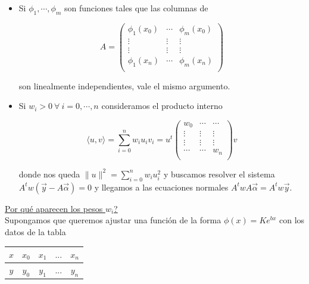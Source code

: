 \begin{itemize}
	\item Si $\phi_{1}, \cdots, \phi_{m}$ son funciones tales que las columnas de
	
	$$
	A = 
	\begin{pmatrix}
        \phi_{1}(x_{0}) & \cdots & \phi_{m}(x_{0})\\
        \vdots & \vdots & \vdots\\
        \vdots & \vdots & \vdots\\
        \phi_{1}(x_{n}) & \cdots & \phi_{m}(x_{n})\\
    \end{pmatrix}
	$$
	
	 son linealmente independientes, vale el mismo argumento.
	 
	\item Si $w_{i} > 0\ \forall \ i = 0, \cdots, n$ consideramos el producto interno
	
	$$\langle u, v \rangle = \sum \limits_{i = 0}^{n} w_{i}u_{i}v_{i} = u^{t}\begin{pmatrix}
        w_{0} & \cdots & \cdots\\
        \vdots & \vdots & \vdots\\
        \vdots & \vdots & \vdots\\
        \cdots & \cdots & w_{n}\\
    \end{pmatrix}v$$
	
	donde nos queda $\|u\|^{2} = \sum \limits_{i = 0}^{n} w_{i}u_{i}^{2}$ y buscamos resolver el sistema $A^{t}w(\Vec{y} - A\Vec{\alpha}) = 0$ y llegamos a las ecuaciones normales $A^{t}wA\Vec{\alpha} = A^{t}w\Vec{y}$.\\
\end{itemize}

\underline{Por qu\'e aparecen los pesos $w_{i}$?}\\

Supongamos que queremos ajustar una funci\'on de la forma $\phi(x) = Ke^{bx}$ con los datos de la tabla 

\begin{table}[ht]
    \centering
    \begin{tabular}{|c|c|c|c|c|}
        \hline
        $x$ & $x_{0}$ & $x_{1}$ & $...$ & $x_{n}$\\ \hline
        $y$ & $y_{0}$ & $y_{1}$ & $...$ & $y_{n}$\\ \hline
    \end{tabular}
\end{table}

